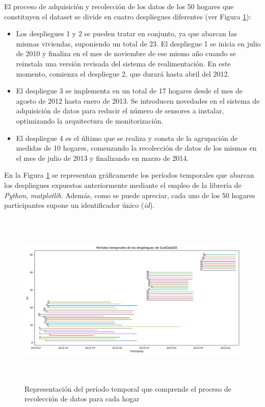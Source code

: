 El proceso de adquisición y recolección de los datos de los 50 hogares que constituyen el dataset se divide en cuatro despliegues diferentes (ver Figura \ref{fig:despliegues}):

\begin{itemize}
    \item Los despliegues 1 y 2 se pueden tratar en conjunto, ya que abarcan las mismas viviendas, suponiendo un total de 23. El despliegue 1 se inicia en julio de 2010 y finaliza en el mes de noviembre de ese mismo año cuando se reinstala una versión revisada del sistema de realimentación. En este momento, comienza el despliegue 2, que durará hasta abril del 2012.
    \item El despliegue 3 se implementa en un total de 17 hogares desde el mes de agosto de 2012 hasta enero de 2013. Se introducen novedades en el sistema de adquisición de datos para reducir el número de sensores a instalar, optimizando la arquitectura de monitorización. 
    \item El despliegue 4 es el último que se realiza y consta de la agrupación de medidas de 10 hogares, comenzando la recolección de datos de los mismos en el mes de julio de 2013 y finalizando en marzo de 2014.
\end{itemize}

En la Figura \ref{fig:despliegues} se representan gráficamente los períodos temporales que abarcan los despliegues expuestos anteriormente mediante el empleo de la librería de \textit{Python}, \textit{matplotlib}. Además, como se puede apreciar, cada uno de los 50 hogares participantes supone un identificador único (\textit{id}). 

\vspace{3mm}

\begin{figure}[h!]
    \centering
    \includegraphics[width=1\textwidth,height=8.5cm]{img/diseno/despliegues.png}
    \caption{Representación del período temporal que comprende el proceso de recolección de datos para cada hogar}
    \label{fig:despliegues}
\end{figure}


